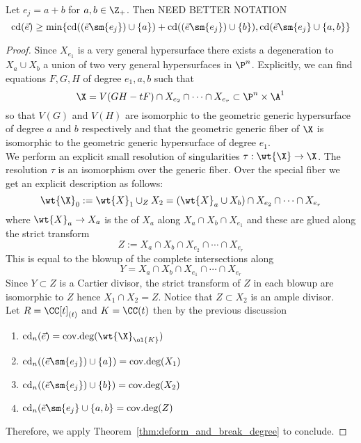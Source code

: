 \documentclass[12pt]{article}
\DeclareMathOperator{\covdeg}{\text{cov.deg}}
\DeclareMathOperator{\cd}{\text{cd}}
\begin{document}
\begin{theorem} \label{thm:inductive_bound}
Let $e_j = a + b$ for $a, b \in \Z_+$. Then {\color{red} NEED BETTER NOTATION}
\[ \cd(\vec{e}) \ge \min \{ \cd((\vec{e} \sm \{ e_j \}) \cup \{ a \}) + \cd((\vec{e} \sm \{ e_j \}) \cup \{ b \}), \cd(\vec{e} \sm \{ e_j \} \cup \{ a, b\} \} \] 
\end{theorem}

\begin{proof}
Since $X_{e_1}$ is a very general hypersurface there exists a degeneration to $X_a \cup X_b$ a union of two very general hypersurfaces in $\P^n$. Explicitly, we can find equations $F,G,H$ of degree $e_1, a, b$ such that 
\[ \X = V(GH - t F) \cap X_{e_2} \cap \cdots \cap X_{e_r}  \subset \P^n \times \A^1 \]
so that $V(G)$ and $V(H)$ are isomorphic to the geometric generic hypersurface of degree $a$ and $b$ respectively and that the geometric generic fiber of $\X$ is isomorphic to the geometric generic hypersurface of degree $e_1$. 
\bigskip\\
We perform an explicit small resolution of singularities $\tau : \wt{\X} \to \X$. The resolution $\tau$ is an isomorphism over the generic fiber. Over the special fiber we get an explicit description as follows:
\[ \wt{\X}_0 := \wt{X}_1 \cup_Z X_2 = (\wt{X}_a \cup X_b) \cap X_{e_2} \cap \cdots \cap X_{e_r} \]
where $\wt{X}_a \to X_a$ is the of $X_a$ along $X_a \cap X_b \cap X_{e_1}$ and these are glued along the strict transform
\[ Z := X_{a} \cap X_{b} \cap X_{e_2} \cap \cdots \cap X_{e_r} \]
This is equal to the blowup of the complete intersections along
\[ Y = X_{a} \cap X_{b} \cap X_{e_1} \cap \cdots \cap X_{e_r} \]
Since $Y \subset Z$ is a Cartier divisor, the strict transform of $Z$ in each blowup are isomorphic to $Z$ hence $X_1 \cap X_2 = Z$. Notice that $Z \subset X_2$ is an ample divisor. 
\bigskip\\
Let $R = \CC[t]_{(t)}$ and $K = \CC(t)$ then by the previous discussion 
\begin{enumerate}
\item $\cd_n(\vec{e}) = \covdeg(\wt{\X}_{\ol{K}})$
\item $\cd_n((\vec{e} \sm \{ e_j \}) \cup \{ a \}) = \covdeg(X_1)$
\item $\cd_n((\vec{e} \sm \{ e_j \}) \cup \{ b \}) = \covdeg(X_2)$
\item $\cd_n(\vec{e} \sm \{ e_j \} \cup \{ a, b\} = \covdeg(Z)$
\end{enumerate}
Therefore, we apply Theorem~\ref{thm:deform_and_break_degree} to conclude.
\end{proof}
\end{document}
